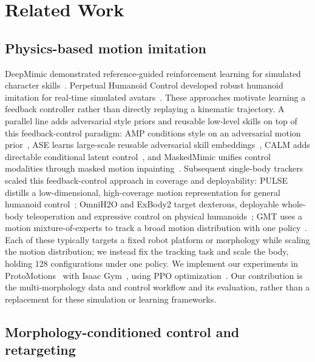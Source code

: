 \section{Related Work}\label{sec:related_work}

\subsection{Physics-based motion imitation}

DeepMimic demonstrated reference-guided reinforcement learning for simulated
character skills~\cite{deepmimic}. Perpetual Humanoid Control developed robust
humanoid imitation for real-time simulated avatars~\cite{phc}. These approaches
motivate learning a feedback controller rather than directly replaying a
kinematic trajectory. A parallel line adds adversarial style priors and
reusable low-level skills on top of this feedback-control paradigm: AMP
conditions style on an adversarial motion prior~\cite{amp}, ASE learns
large-scale reusable adversarial skill embeddings~\cite{ase}, CALM adds
directable conditional latent control~\cite{calm}, and MaskedMimic unifies
control modalities through masked motion inpainting~\cite{maskedmimic}.
Subsequent single-body trackers scaled this
feedback-control approach in coverage and deployability: PULSE distills a
low-dimensional, high-coverage motion representation for general humanoid
control~\cite{pulse}; OmniH2O and ExBody2 target dexterous, deployable
whole-body teleoperation and expressive control on physical
humanoids~\cite{omnih2o,exbody2}; GMT uses a motion mixture-of-experts to
track a broad motion distribution with one policy~\cite{gmt}. Each of these
typically targets a fixed robot platform or morphology while scaling the
motion distribution; we instead fix the tracking task and scale the body,
holding 128 configurations under one
policy. We implement our experiments in
ProtoMotions~\cite{protomotions} with Isaac Gym~\cite{isaacgym}, using PPO
optimization~\cite{ppo}. Our contribution is the multi-morphology data and
control workflow and its evaluation, rather than a replacement for these
simulation or learning frameworks.

\subsection{Morphology-conditioned control and retargeting}


